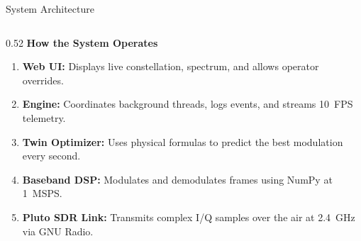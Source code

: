 \documentclass[aspectratio=169, 10pt]{beamer}
\begin{document}
\begin{frame}{System Architecture}
\begin{columns}[T]
    \begin{column}{0.52\linewidth}
      \textbf{\color{primaryblue}\normalsize How the System Operates}\\[0.15cm]
      \begin{enumerate}\setlength{\itemsep}{6pt}\small
        \item \textbf{Web UI:} Displays live constellation, spectrum, and allows operator overrides.
        \item \textbf{Engine:} Coordinates background threads, logs events, and streams 10~FPS telemetry.
        \item \textbf{Twin Optimizer:} Uses physical formulas to predict the best modulation every second.
        \item \textbf{Baseband DSP:} Modulates and demodulates frames using NumPy at 1~MSPS.
        \item \textbf{Pluto SDR Link:} Transmits complex I/Q samples over the air at 2.4~GHz via GNU Radio.
      \end{enumerate}
    \end{column}
  \end{columns}
\end{frame}
\end{document}
